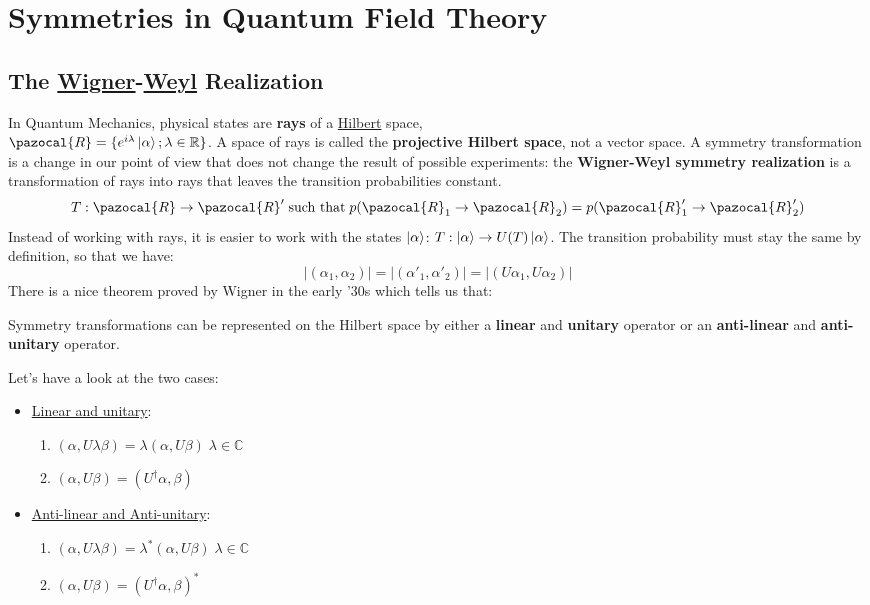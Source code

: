 \documentclass[../main.tex]{subfiles}
\begin{document}
\setchapterpreamble[u]{\margintoc}
\chapter[Symmetries in Quantum Field Theory]{Symmetries in Quantum Field Theory\footnotemark[0]}
\section{The \href{https://en.wikipedia.org/wiki/Eugene_Wigner}{Wigner}-\href{https://en.wikipedia.org/wiki/Hermann_Weyl}{Weyl} Realization}
In Quantum Mechanics, physical states are \textbf{rays} of a \href{https://en.wikipedia.org/wiki/David_Hilbert}{Hilbert} space,\\
$\pazocal{R}=\{e^{i\lambda}\ket{\alpha};\lambda\in\mathbb{R}\}$. A space of rays is called the \textbf{projective Hilbert space}, not a vector space. A symmetry transformation is a change in our point of view that does not change the result of possible experiments: the \textbf{Wigner-Weyl symmetry realization} is a transformation of rays into rays that leaves the transition probabilities constant.
\[
T:\pazocal{R}\to\pazocal{R}' \;\text{such that}\;p(\pazocal{R}_1\to\pazocal{R}_2)=p(\pazocal{R}'_1\to\pazocal{R}'_2)
\]
Instead of working with rays, it is easier to work with the states $\ket{\alpha}$: $T:\ket{\alpha}\to U(T)\ket{\alpha}$. The transition probability must stay the same by definition, so that we have:
\[
|(\alpha_1,\alpha_2)|=|(\alpha'_1,\alpha'_2)|=|(U\alpha_1,U\alpha_2)|
\]
There is a nice theorem proved by Wigner in the early '30s which tells us that:
\begin{theorem}[Wigner]
Symmetry transformations can be represented on the Hilbert space by either a \textbf{linear} and \textbf{unitary} operator or an \textbf{anti-linear} and \textbf{anti-unitary} operator.
\end{theorem}
Let's have a look at the two cases:
\begin{itemize}
    \item \underline{Linear and unitary}:
    \begin{enumerate}
        \item $(\alpha,U\lambda\beta)=\lambda(\alpha,U\beta)\;\lambda\in\mathbb{C}$
        \item $(\alpha,U\beta)=(U^\dagger\alpha,\beta)$
    \end{enumerate}
    \item \underline{Anti-linear and Anti-unitary}:
    \begin{enumerate}
        \item $(\alpha,U\lambda\beta)=\lambda^*(\alpha,U\beta)\;\lambda\in\mathbb{C}$
        \item $(\alpha,U\beta)=(U^\dagger\alpha,\beta)^*$
    \end{enumerate}
\end{itemize}
\end{document}
